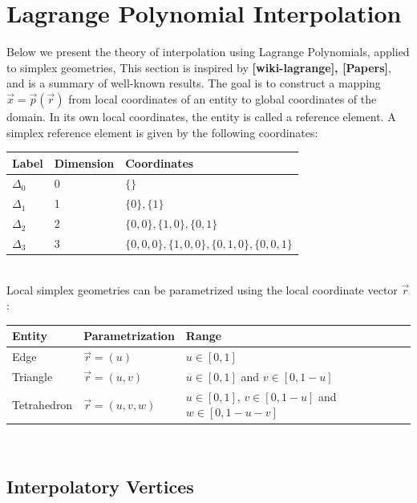 \section{Lagrange Polynomial Interpolation}
\label{theory-lagrange}

Below we present the theory of interpolation using Lagrange Polynomials, applied to simplex geometries, This section is inspired by \textbf{[wiki-lagrange], [Papers]}, and is a summary of well-known results. The goal is to construct a mapping $\vec{x} = \vec{p}(\vec{r})$ from local coordinates of an entity to global coordinates of the domain. In its own local coordinates, the entity is called \citeDune{} a reference element. A simplex reference element is given by the following coordinates: \\

\noindent
\begin{tabular}{l l l}
\hline
  Label & Dimension & Coordinates \\ \hline
  $\Delta_0$ & 0 & $\{ \}$ \\
  $\Delta_1$ & 1 & $\{ 0\}, \{ 1\}$ \\
  $\Delta_2$ & 2 & $\{ 0, 0 \}, \{ 1, 0 \}, \{ 0, 1 \}$ \\
  $\Delta_3$ & 3 & $\{ 0, 0, 0 \}, \{ 1, 0, 0 \}, \{ 0, 1, 0 \}, \{ 0, 0, 1 \}$ \\
\end{tabular} \\

\noindent
Local simplex geometries can be parametrized using the local coordinate vector $\vec{r}$: \\

\noindent
\begin{tabular}{l l l}
\hline
  Entity      & Parametrization    & Range \\ \hline
  Edge        & $\vec{r}=(u)$      & $u \in [0,1]$ \\
  Triangle    & $\vec{r}=(u,v)$    & $u \in [0,1]$ and $v \in [0, 1-u]$ \\
  Tetrahedron & $\vec{r}=(u,v,w)$  & $u \in [0,1]$, $v \in [0, 1-u]$ and $w \in [0, 1-u-v]$ \\
\end{tabular} \\

\subsection{Interpolatory Vertices}
\label{theory-lagrange-vertices}

